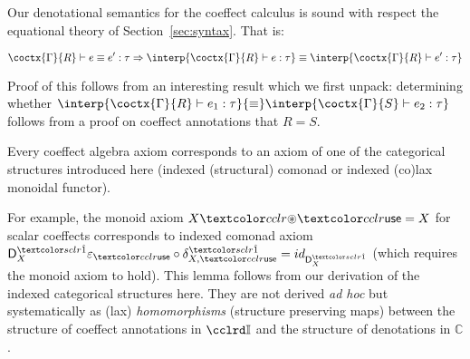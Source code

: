 \noindent
Our denotational semantics for the coeffect
calculus is sound with respect the equational theory of Section~\ref{sec:syntax}. That is:
\begin{theorem}[Soundness]
$$\coctx{\Gamma}{R} \vdash e \equiv e' : \tau \Rightarrow \interp{\coctx{\Gamma}{R} \vdash e : \tau} 
\equiv \interp{\coctx{\Gamma}{R} \vdash e' : \tau}$$
\end{theorem}
\noindent
Proof of this follows from an interesting result which we 
first unpack: determining whether $\interp{\coctx{\Gamma}{R} \vdash
  e_1 : \tau} {\equiv} \interp{\coctx{\Gamma}{S} \vdash e_2 : \tau}$ follows
from a proof on coeffect annotations that $R = S$. 
%
\begin{lemma}
Every coeffect algebra axiom corresponds to an axiom 
of one of the categorical structures introduced here (indexed (structural) comonad or 
  indexed (co)lax monoidal functor). 
\end{lemma}
%
\noindent
For example, the monoid axiom $X \cseq \cunit =
X$ for scalar coeffects corresponds to indexed comonad axiom $\D^{\sunit}_X \varepsilon_{\cunit}
\circ \delta^{\sunit}_{X,{\cunit}} = id_{\D^{\sunit}_X}$ (which requires the monoid axiom to hold). 
This lemma follows from our derivation of 
the indexed categorical structures here. They are not derived \emph{ad hoc} but systematically 
as (lax) \emph{homomorphisms} (structure preserving maps) between the structure of 
coeffect annotations in $\Icat$ and the structure of denotations in $\mathbb{C}$. 

